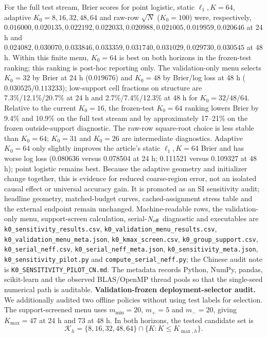 \documentclass[11pt,a4paper]{article}
\numberwithin{equation}{section}
\theoremstyle{definition}\newtheorem{definition}[theorem]{Definition}
\theoremstyle{remark}\newtheorem{remark}[theorem]{Remark}
\begin{document}
For the full test stream, Brier scores for point logistic, static $\ell_1,K=64$, adaptive $K_0=8,16,32,48,64$ and raw-row $\sqrt{N}$ ($K_0=100$) were, respectively, $0.016000,0.020135,0.022192,0.022033,0.020988,0.021005,0.019959,0.020646$ at 24 h and $0.024082,0.030070,0.033846,0.033359,0.031740,0.031029,0.029730,0.030545$ at 48 h. Within this finite menu, $K_0=64$ is best on both horizons in the frozen-test ranking; this ranking is post-hoc reporting only. The validation-only menu selects $K_0=32$ by Brier at 24 h ($0.019676$) and $K_0=48$ by Brier/log loss at 48 h ($0.030525/0.113233$); low-support cell fractions on structure are 7.3\%/12.1\%/20.7\% at 24 h and 2.7\%/7.4\%/12.3\% at 48 h for $K_0=32/48/64$. Relative to the current $K_0=16$, the frozen-test $K_0=64$ ranking lowers Brier by 9.4\% and 10.9\% on the full test stream and by approximately 17--21\% on the frozen outside-support diagnostic. The raw-row square-root choice is less stable than $K_0=64$; $K_0=31$ and $K_0=26$ are intermediate diagnostics. Adaptive $K_0=64$ only slightly improves the article's static $\ell_1,K=64$ Brier and has worse log loss (0.080636 versus 0.078504 at 24 h; 0.111521 versus 0.109327 at 48 h); point logistic remains best. Because the adaptive geometry and initializer change together, this is evidence for reduced coarse-region error, not an isolated causal effect or universal accuracy gain. It is promoted as an SI sensitivity audit; headline geometry, matched-budget curves, cached-assignment stress table and the external endpoint remain unchanged. Machine-readable rows, the validation-only menu, support-screen calculation, serial-$N_{\rm eff}$ diagnostic and executables are \texttt{k0\_sensitivity\_results.csv}, \texttt{k0\_validation\_menu\_results.csv}, \texttt{k0\_validation\_menu\_meta.json}, \texttt{k0\_kmax\_screen.csv}, \texttt{k0\_group\_support.csv}, \texttt{k0\_serial\_neff.csv}, \texttt{k0\_serial\_neff\_meta.json}, \texttt{k0\_sensitivity\_meta.json}, \texttt{k0\_sensitivity\_pilot.py} and \texttt{compute\_serial\_neff.py}; the Chinese audit note is \texttt{K0\_SENSITIVITY\_PILOT\_CN.md}. The metadata records Python, NumPy, pandas, scikit-learn and the observed BLAS/OpenMP thread pools so that the single-seed numerical path is auditable.
\textbf{Validation-frozen deployment-selector audit.} We additionally audited two offline policies without using test labels for selection. The support-screened menu uses $m_{\min}=20$, $m_+=5$ and $m_-=20$, giving $K_{\max}=47$ at 24 h and $73$ at 48 h. In both horizons, the tested candidate set is
\[
\mathcal K_h=\{8,16,32,48,64\}\cap\{K:K\le K_{\max,h}\}.
\]
\end{document}
